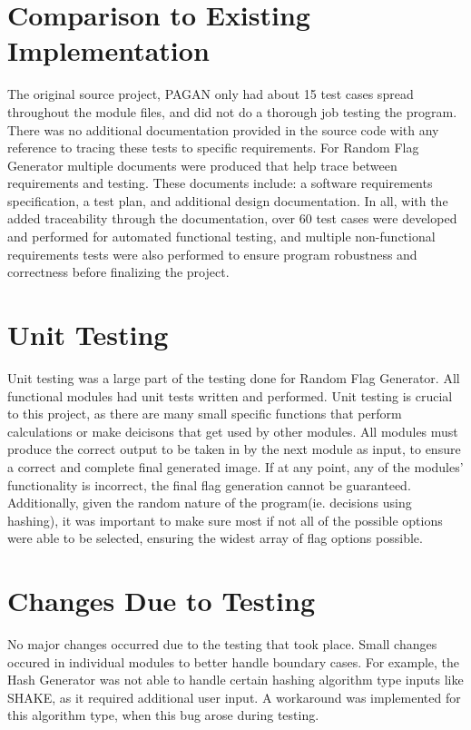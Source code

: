 \documentclass[12pt, titlepage]{article}
\begin{document}
\section{Comparison to Existing Implementation}
The original source project, PAGAN only had about 15 test cases spread
throughout the module files, and did not do a thorough job testing the
program. There was no additional documentation provided in the source code
with any reference to tracing these tests to specific requirements. For Random
Flag Generator multiple documents were produced that help trace between
requirements and testing. These documents include: a software requirements
specification, a test plan, and additional design documentation. In all, with
the added traceability through the documentation, over 60 test cases were
developed and performed for automated functional testing, and multiple
non-functional requirements tests were also performed to ensure program
robustness and correctness before finalizing the project.

\section{Unit Testing}
Unit testing was a large part of the testing done for Random Flag Generator.
All functional modules had unit tests written and performed. Unit testing is
crucial to this project, as there are many small specific functions that
perform calculations or make deicisons that get used by other modules. All
modules must produce the correct output to be taken in by the next module as
input, to ensure a correct and complete final generated image. If at any
point, any of the modules' functionality is incorrect, the final flag
generation cannot be guaranteed. Additionally, given the random nature of the
program(ie. decisions using hashing), it was important to make sure most if
not all of the possible options were able to be selected, ensuring the widest
array of flag options possible.

\section{Changes Due to Testing}
No major changes occurred due to the testing that took place. Small changes
occured in individual modules to better handle boundary cases. For example,
the Hash Generator was not able to handle certain hashing algorithm type
inputs like SHAKE, as it required additional user input. A workaround was
implemented for this algorithm type, when this bug arose during testing.
\end{document}
